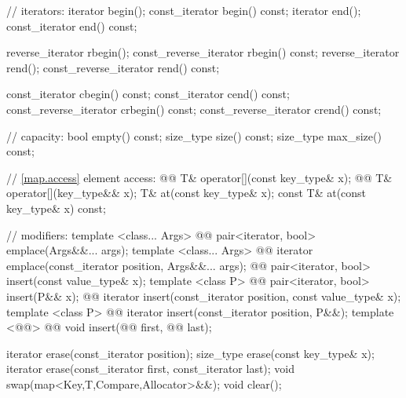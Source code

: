 \documentclass[american,twoside]{book}
\begin{document}
\begin{codeblock}
{{    // iterators:
    iterator               begin();
    const_iterator         begin() const;
    iterator               end();
    const_iterator         end() const;

    reverse_iterator       rbegin();
    const_reverse_iterator rbegin() const;
    reverse_iterator       rend();
    const_reverse_iterator rend() const;

    const_iterator         cbegin() const;
    const_iterator         cend() const;
    const_reverse_iterator crbegin() const;
    const_reverse_iterator crend() const;

    // capacity:
    bool      empty() const;
    size_type size() const;
    size_type max_size() const;

    // \ref{map.access} element access:
    @@ T& operator[](const key_type& x);
    @@ T& operator[](key_type&& x);
    T&       at(const key_type& x);
    const T& at(const key_type& x) const;

    // modifiers:
    template <class... Args> 
      @@
      pair<iterator, bool> emplace(Args&&... args);
    template <class... Args> 
      @@
      iterator emplace(const_iterator position, Args&&... args);
    @@ pair<iterator, bool> insert(const value_type& x);
    template <class P> 
      @@
      pair<iterator, bool> insert(P&& x);
    @@ iterator insert(const_iterator position, const value_type& x);
    template <class P>
      @@
      iterator insert(const_iterator position, P&&);
    template <@@>
      @@
      void insert(@@ first, @@ last);

    iterator  erase(const_iterator position);
    size_type erase(const key_type& x);
    iterator  erase(const_iterator first, const_iterator last);
    void swap(map<Key,T,Compare,Allocator>&&);
    void clear();

}}
\end{codeblock}
\end{document}
